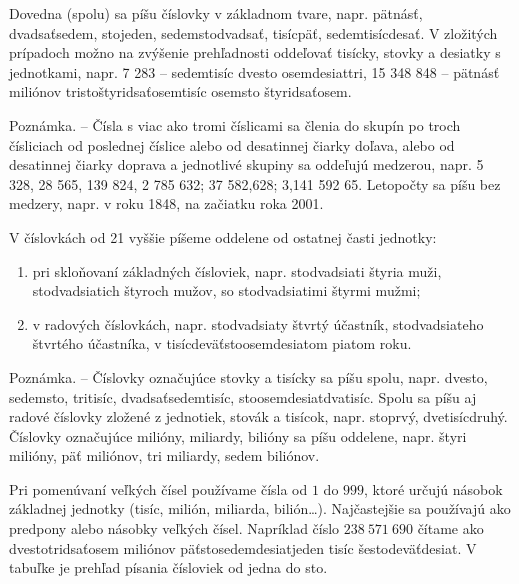 \documentclass{report}
\begin{document}
\begin{displayquote}
  Dovedna (spolu) sa píšu číslovky v základnom tvare, napr. pätnásť, dvadsaťsedem, stojeden, sedemstodvadsať, tisícpäť, sedemtisícdesať. V zložitých prípadoch možno na zvýšenie prehľadnosti oddeľovať tisícky, stovky a desiatky s jednotkami, napr. 7 283 – sedemtisíc dvesto osemdesiattri, 15 348 848 – pätnásť miliónov tristoštyridsaťosemtisíc osemsto štyridsaťosem.

  Poznámka. – Čísla s viac ako tromi číslicami sa členia do skupín po troch čísliciach od poslednej číslice alebo od desatinnej čiarky doľava, alebo od desatinnej čiarky doprava a jednotlivé skupiny sa oddeľujú medzerou, napr. 5 328, 28 565, 139 824, 2 785 632; 37 582,628; 3,141 592 65. Letopočty sa píšu bez medzery, napr. v roku 1848, na začiatku roka 2001.

  V číslovkách od 21 vyššie píšeme oddelene od ostatnej časti jednotky:

  \begin{enumerate}[label=\alph*)]
  \item pri skloňovaní základných čísloviek, napr. stodvadsiati štyria muži, stodvadsiatich štyroch mužov, so stodvadsiatimi štyrmi mužmi;
  \item v radových číslovkách, napr. stodvadsiaty štvrtý účastník, stodvadsiateho štvrtého účastníka, v tisícdeväťstoosemdesiatom piatom roku.
  \end{enumerate}

  Poznámka. – Číslovky označujúce stovky a tisícky sa píšu spolu, napr. dvesto, sedemsto, tritisíc, dvadsaťsedemtisíc, stoosemdesiatdvatisíc. Spolu sa píšu aj radové číslovky zložené z jednotiek, stovák a tisícok, napr. stoprvý, dvetisícdruhý. Číslovky označujúce milióny, miliardy, bilióny sa píšu oddelene, napr. štyri milióny, päť miliónov, tri miliardy, sedem biliónov.\cite{psp2000}
\end{displayquote}

Pri pomenúvaní veľkých čísel používame čísla od \(1\) do \(999\), ktoré určujú násobok základnej jednotky (tisíc, milión, miliarda, bilión\dots). Najčastejšie sa používajú ako predpony alebo násobky veľkých čísel. Napríklad číslo \(238\ 571\ 690\) čítame ako dvestotridsaťosem miliónov päťstosedemdesiatjeden tisíc šestodeväťdesiat. V tabuľke je prehľad písania čísloviek od jedna do sto.
\end{document}
